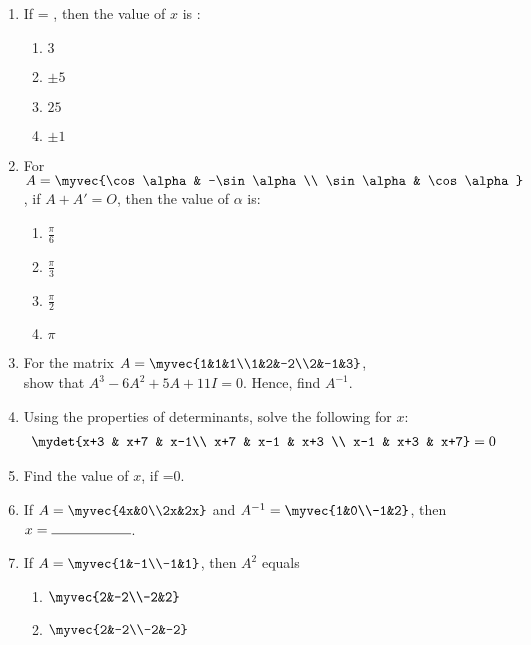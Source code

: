 \begin{enumerate}
\item If  = , then the value of $x$ is :
	\begin{enumerate}
		\item $3$
		\item $\pm5$
		\item $25$
		\item $\pm1$
	\end{enumerate}
\item For $A= \myvec{\cos\alpha & -\sin\alpha \\ \sin\alpha & \cos\alpha}$, if $A + A' = O$, then the value of $\alpha$ is:
	\begin{enumerate}
		\item $\frac{\pi}{6}$
		\item $\frac{\pi}{3}$
		\item $\frac{\pi}{2}$
		\item $\pi$
	\end{enumerate}
\item For the matrix $A = \myvec{1&1&1\\1&2&-2\\2&-1&3}$, \\show that $A^3 -6A^2 + 5A +11I = 0$. Hence, find $A^{-1}$.
\item Using the properties of determinants, solve the following for $x$: 
	\begin{align}
		\mydet{x+3 & x+7 & x-1\\ 
		x+7 & x-1 & x+3 \\
		x-1 & x+3 & x+7} = 0
	\end{align}
\item Find the value of $x$, if =0.
\item If $A= \myvec{4x&0\\2x&2x}$ and $A^{-1}=\myvec{1&0\\-1&2}$, then $x= \rule{2cm}{0.15mm}$.
\item If $A=\myvec{1&-1\\-1&1}$, then $A^2$ equals 
	\begin{enumerate}
		\item $\myvec{2&-2\\-2&2}$
		\item $\myvec{2&-2\\-2&-2}$

\end{enumerate}
\end{enumerate}
